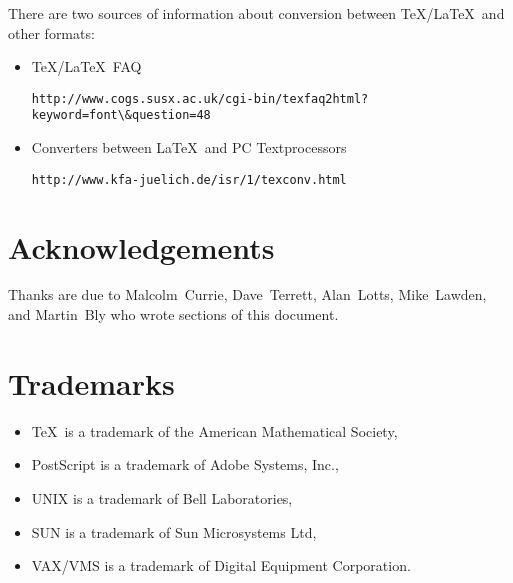\documentclass[11pt,twoside]{article}
\newcommand{\htmladdnormallink}[2]{#1}
\newenvironment{latexonly}{}{}
\newcommand{\xlabel}[1]{}
\begin{document}
There are two sources of information about conversion between \TeX/\LaTeX\ and
other formats:

\begin{itemize}
  \item \htmladdnormallink{\TeX/\LaTeX\ FAQ}
    {http://www.cogs.susx.ac.uk/cgi-bin/texfaq2html?keyword=font&question=48}
    \begin{latexonly}
      \begin{verbatim}
http://www.cogs.susx.ac.uk/cgi-bin/texfaq2html?keyword=font\&question=48
      \end{verbatim}
    \end{latexonly}
  \item \htmladdnormallink{Converters between \LaTeX\ and PC Textprocessors}
    {http://www.kfa-juelich.de/isr/1/texconv.html}
    \begin{latexonly}
      \begin{verbatim}
http://www.kfa-juelich.de/isr/1/texconv.html
      \end{verbatim}
    \end{latexonly}
\end{itemize}


\section{\xlabel{acknowledgements}\label{acknowledgements}Acknowledgements}

Thanks are due to Malcolm~Currie, Dave~Terrett, Alan~Lotts,
Mike~Lawden, and Martin~Bly who wrote sections of this document.

\section{\xlabel{trademarks}\label{trademarks}Trademarks}
\begin{itemize}
\item \TeX\ is a trademark of the American Mathematical Society,
\item PostScript is a trademark of Adobe Systems, Inc.,
\item UNIX is a trademark of Bell Laboratories,
\item SUN is a trademark of Sun Microsystems Ltd,
\item VAX/VMS is a trademark of Digital Equipment Corporation.
\end{itemize}

\newpage
{}~

\typeout{}
\typeout{}
\typeout{}
\typeout{}
\end{document}
